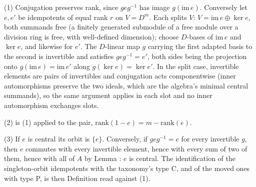 (1) Conjugation preserves rank, since $geg^{-1}$ has image $g(\mathrm{im}\, e)$. Conversely let $e, e'$ be idempotents of equal rank $r$ on $V = D^m$. Each splits $V$: $V = \mathrm{im}\,e \oplus \ker e$, both summands free (a finitely generated submodule of a free module over a division ring is free, with well-defined dimension); choose $D$-bases of $\mathrm{im}\,e$ and $\ker e$, and likewise for $e'$. The $D$-linear map $g$ carrying the first adapted basis to the second is invertible and satisfies $g e g^{-1} = e'$, both sides being the projection onto $g(\mathrm{im}\,e) = \mathrm{im}\,e'$ along $g(\ker e) = \ker e'$. In the split case, invertible elements are pairs of invertibles and conjugation acts componentwise (inner automorphisms preserve the two ideals, which are the algebra's minimal central summands), so the same argument applies in each slot and no inner automorphism exchanges slots.

(2) is (1) applied to the pair, $\mathrm{rank}(1-e) = m - \mathrm{rank}(e)$.

(3) If $e$ is central its orbit is $\{e\}$. Conversely, if $geg^{-1} = e$ for every invertible $g$, then $e$ commutes with every invertible element, hence with every sum of two of them, hence with all of $A$ by Lemma : $e$ is central. The identification of the singleton-orbit idempotents with the taxonomy's type C, and of the moved ones with type P, is then Definition  read against (1).
